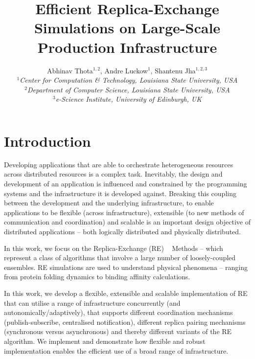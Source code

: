 \documentclass[a4paper,10pt]{article}
\begin{document}
\title{\LARGE Efficient Replica-Exchange Simulations on
  Large-Scale Production Infrastructure}

 

\author{Abhinav Thota$^{1,2}$, Andre Luckow$^{1}$, Shantenu Jha$^{1,2,3}$\\
   \small{\emph{$^{1}$Center for Computation \& Technology, Louisiana State University, USA}}\\
   \small{\emph{$^{2}$Department of Computer Science, Louisiana State University, USA}}\\
   \small{\emph{$^{3}$e-Science Institute, University of Edinburgh, UK}}
   }
 
\maketitle

\section{Introduction}
 
Developing applications that are able to orchestrate heterogeneous
resources across distributed resources is a complex task.  Inevitably,
the design and development of an application is influenced and
constrained by the programming systems and the infrastructure it is
developed against. Breaking this coupling between the development and
the underlying infrastructure, to enable applications to be flexible
(across infrastructure), extensible (to new methods of communication
and coordination) and scalable is an important design objective of
distributed applications -- both logically distributed and physically
distributed.

In this work, we focus on the Replica-Exchange (RE)
~\cite{hansmann,Sugita:1999rm} Methods -- which represent a class of
algorithms that involve a large number of loosely-coupled ensembles.
RE simulations are used to understand physical phenomena -- ranging
from protein folding dynamics to binding affinity calculations.

In this work, we develop a flexible, extensible and scalable
implementation of RE that can utilise a range of infrastructure
concurrently (and autonomically/adaptively), that supports different
coordination mechanisms (publish-subscribe, centralised notification),
different replica pairing mechanisms (synchronous versus asynchronous)
and thereby different variants of the RE algorithm. We implement and
demonstrate how flexible and robust implementation enables the
efficient use of a broad range of infrastructure.
\end{document}
